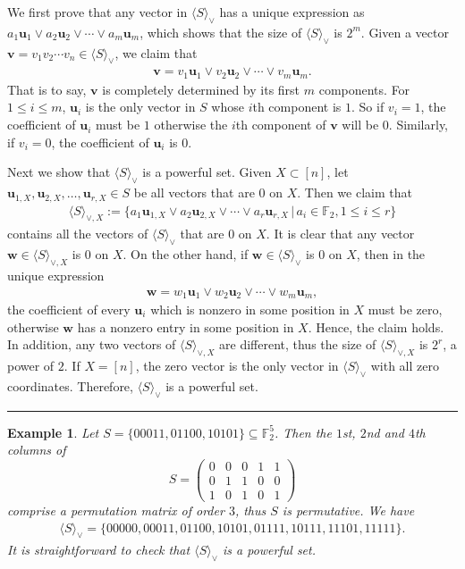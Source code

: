\documentclass[12pt]{article}
\newtheorem{exa}[thm]{Example}
\def\qed{\hfill \rule{4pt}{7pt}}
\begin{document}
We first prove that any vector in $\langle S\rangle_{\vee}$ has a unique expression as $a_1\mathbf{u}_1\vee a_2\mathbf{u}_2\vee\cdots\vee a_m\mathbf{u}_m$, which shows that the size of $\langle S\rangle_{\vee}$ is $2^m$. Given a vector $\mathbf{v}=v_1v_2\cdots v_n\in \langle S\rangle_{\vee}$, we claim that
\begin{align*}
\mathbf{v}=v_1\mathbf{u}_1\vee v_2\mathbf{u}_2\vee\cdots\vee v_m\mathbf{u}_m.
\end{align*}
That is to say, $\mathbf{v}$ is completely determined by its first $m$ components. For $1\leq i\leq m$, $\mathbf{u}_i$ is the only vector in $S$ whose $i$th component is $1$. So if $v_i=1$, the coefficient of $\mathbf{u}_i$ must be $1$ otherwise the $i$th component of $\mathbf{v}$ will be $0$. Similarly, if $v_i=0$, the coefficient of $\mathbf{u}_i$ is $0$.

Next we show that $\langle S\rangle_{\vee}$ is a powerful set.  Given $X\subset[n]$, let $\mathbf{u}_{1,X},\mathbf{u}_{2,X},\ldots,\mathbf{u}_{r,X}\in S$ be all vectors that are 0 on $X$.  Then we claim that
\begin{align*}
\langle S\rangle_{\vee,X}:=\{a_1\mathbf{u}_{1,X}\vee a_2\mathbf{u}_{2,X}\vee\cdots\vee a_r\mathbf{u}_{r,X}\,|\,a_i\in\mathbb{F}_2,1\leq i\leq r\}
\end{align*}
contains all the vectors of $\langle S\rangle_{\vee}$ that are 0 on $X$.  It is clear that any vector $\mathbf{w}\in \langle S\rangle_{\vee,X}$ is 0 on $X$.  On the other hand, if
$\mathbf{w}\in \langle S\rangle_{\vee}$ is 0 on $X$, then in the unique expression
\begin{align*}
\mathbf{w}=w_1\mathbf{u}_1\vee w_2\mathbf{u}_2\vee\cdots\vee w_m\mathbf{u}_m,
\end{align*}
the coefficient of every $\mathbf{u}_i$ which is nonzero in some position in $X$ must be zero, otherwise $\mathbf{w}$ has a nonzero entry in some position in $X$.  Hence, the claim holds.  In addition, any two vectors of $\langle S\rangle_{\vee,X}$ are different, thus the size of $\langle S\rangle_{\vee,X}$ is $2^r$, a power of $2$.  If $X=[n]$, the zero vector is the only vector in $\langle S\rangle_{\vee}$ with all zero coordinates.  Therefore, $\langle S\rangle_{\vee}$ is a powerful set.\qed

\begin{exa}
\label{eg:perm}
Let $S=\{00011,01100,10101\}\subseteq\mathbb{F}_2^5$. Then the $1$st, $2$nd and $4$th columns of
\begin{equation*}
S=\left(
\begin{array}{ccccc}
0 &0 &0 &1 &1  \\
0 &1 &1 &0 &0  \\
1 &0 &1 &0 &1
\end{array}
\right)
\end{equation*}
comprise a permutation matrix of order $3$, thus $S$ is permutative.  We have
\begin{align*}
\langle S\rangle_{\vee}=\{00000,00011,01100,10101, 01111, 10111, 11101, 11111\}.
\end{align*}
It is straightforward to check that $\langle S\rangle_{\vee}$ is a powerful set.
\end{exa}
\end{document}
